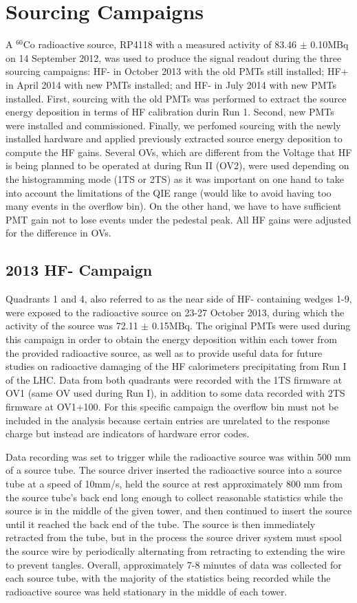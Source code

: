 \section{Sourcing Campaigns}
A $^{60}$Co radioactive source, RP4118 with a measured activity of 83.46 $\pm$
0.10\unit{MBq} on 14 September 2012, was used to produce the signal readout
during the three sourcing campaigns: HF- in October 2013 with the old PMTs still
installed; HF+ in April 2014 with new PMTs installed; and HF- in July 2014 with
new PMTs installed. First, sourcing with the old PMTs was performed to extract
the source energy deposition in terms of HF calibration durin Run 1. Second, new PMTs were installed and commissioned.
Finally, we perfomed sourcing with the newly installed hardware and applied
previously extracted source energy deposition to compute the HF gains. Several
OVs, which are different from the Voltage that HF is being planned to be operated at
during Run II (OV2), were used depending on the histogramming mode (1TS or 2TS) as
it was important on one hand to take into account the limitations of the QIE range
(would like to avoid having too many events in the overflow bin).
On the other hand, we have to have sufficient PMT gain not to lose events under
the pedestal peak. All HF gains were adjusted for the difference in OVs.

\subsection{2013 HF- Campaign}
Quadrants 1 and 4, also referred to as the near side of HF- containing wedges
1-9, were exposed to the radioactive source on 23-27 October 2013, during
which the activity of the source was 72.11 $\pm$ 0.15\unit{MBq}. The original
PMTs were used during this campaign in order to obtain the energy deposition
within each tower from the provided radioactive source, as well as to provide
useful data for future studies on radioactive damaging of the HF calorimeters
precipitating from Run I of the LHC. Data from both quadrants were recorded
with the 1TS firmware at OV1 (same OV used during Run I), in
addition to some data recorded with 2TS firmware at OV1+100. For this
specific campaign the overflow bin must not be included in the analysis
because certain entries are unrelated to the response charge but instead are
indicators of hardware error codes.

Data recording was set to trigger while the radioactive source was within 500 mm
of a source tube. The source driver inserted the radioactive source into a source
tube at a speed of 10\unit{mm/s}, held the source at rest approximately 800 mm
from the source tube's back end long enough to collect reasonable statistics
while the source is in the middle of the given tower, and then continued to
insert the source until it reached the back end of the tube. The source is then
immediately retracted from the tube, but in the process the source driver system
must spool the source wire by periodically alternating from retracting to extending
the wire to prevent tangles. Overall, approximately 7-8 minutes of data was
collected for each source tube, with the majority of the statistics being recorded
while the radioactive source was held stationary in the middle of each tower.

